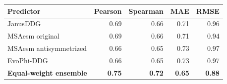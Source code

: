 \begin{tabular}{lrrrr}\toprule Predictor & Pearson & Spearman & MAE & RMSE\\\midrule
JanusDDG & 0.69 & 0.66 & 0.71 & 0.96 \\
MSAesm original & 0.69 & 0.66 & 0.71 & 0.94 \\
MSAesm antisymmetrized & 0.66 & 0.65 & 0.73 & 0.97 \\
EvoPhi-DDG & 0.66 & 0.65 & 0.73 & 0.97 \\
\textbf{Equal-weight ensemble} & \textbf{0.75} & \textbf{0.72} & \textbf{0.65} & \textbf{0.88} \\
\bottomrule\end{tabular}
